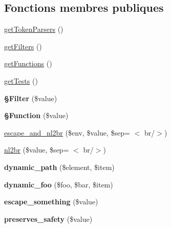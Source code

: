 \subsection*{Fonctions membres publiques}
\begin{DoxyCompactItemize}
\item 
\hyperlink{class_twig_test_extension_a8fd35903c3d01c0f0078f59d142eb063}{get\+Token\+Parsers} ()
\item 
\hyperlink{class_twig_test_extension_a428d91319fc73d3038784cf5436936b6}{get\+Filters} ()
\item 
\hyperlink{class_twig_test_extension_a131c2522f07821f77cd1d038c216031b}{get\+Functions} ()
\item 
\hyperlink{class_twig_test_extension_a7e247dd31cc8d37a6c97353a062a0080}{get\+Tests} ()
\item 
{\bfseries §\+Filter} (\$value)\hypertarget{class_twig_test_extension_aa5d8882e237123275665b97df112a693}{}\label{class_twig_test_extension_aa5d8882e237123275665b97df112a693}

\item 
{\bfseries §\+Function} (\$value)\hypertarget{class_twig_test_extension_a3174b36b470621d3ae41bb096aa1a7a1}{}\label{class_twig_test_extension_a3174b36b470621d3ae41bb096aa1a7a1}

\item 
\hyperlink{class_twig_test_extension_a8a0dffd796da031cd5491bb47fb0eb16}{escape\+\_\+and\+\_\+nl2br} (\$env, \$value, \$sep= \textquotesingle{}$<$ br/$>$\textquotesingle{})
\item 
\hyperlink{class_twig_test_extension_a49343f0d361cca6f98c025fdc118e01c}{nl2br} (\$value, \$sep= \textquotesingle{}$<$ br/$>$\textquotesingle{})
\item 
{\bfseries dynamic\+\_\+path} (\$element, \$item)\hypertarget{class_twig_test_extension_a3cb24aee06a02c9839dc5ea7036a2bd1}{}\label{class_twig_test_extension_a3cb24aee06a02c9839dc5ea7036a2bd1}

\item 
{\bfseries dynamic\+\_\+foo} (\$foo, \$bar, \$item)\hypertarget{class_twig_test_extension_a6d217ca8e5bca2858597f87b2d0dc139}{}\label{class_twig_test_extension_a6d217ca8e5bca2858597f87b2d0dc139}

\item 
{\bfseries escape\+\_\+something} (\$value)\hypertarget{class_twig_test_extension_a56a7ff7dfde90143d920e82332387252}{}\label{class_twig_test_extension_a56a7ff7dfde90143d920e82332387252}

\item 
{\bfseries preserves\+\_\+safety} (\$value)\hypertarget{class_twig_test_extension_af5fe1a210fb08c602fb5eb2b10d4c573}{}\label{class_twig_test_extension_af5fe1a210fb08c602fb5eb2b10d4c573}


\end{DoxyCompactItemize}
